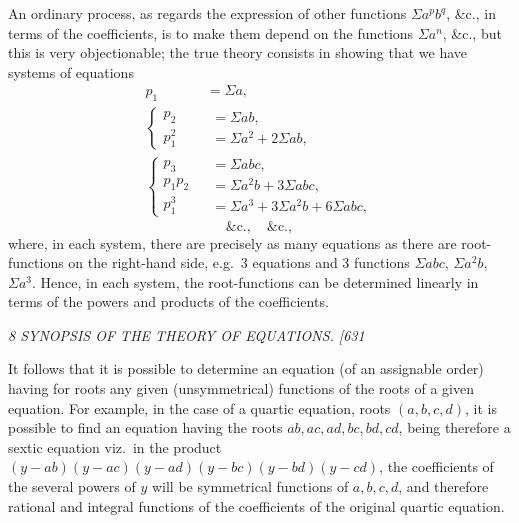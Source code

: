 \documentclass[12pt,a4paper]{article}
\begin{document}
An ordinary process, as regards the expression of other functions $\Sigma a^p b^q$, \&c., in terms of the coefficients, is to make them depend on the functions $\Sigma a^n$, \&c., but this is very objectionable; the true theory consists in showing that we have systems of equations
\[
\begin{array}{rl}
p_1 &= \Sigma a, \\[2pt]
\left\{\begin{array}{r} p_2 \\ p_1^2 \end{array}\right. &
\!\!\!\begin{array}{l} = \Sigma a b, \\ = \Sigma a^2 + 2\Sigma a b, \end{array} \\[10pt]
\left\{\begin{array}{r} p_3 \\ p_1 p_2 \\ p_1^3 \end{array}\right. &
\!\!\!\begin{array}{l} = \Sigma a b c, \\ = \Sigma a^2 b + 3\Sigma a b c, \\ = \Sigma a^3 + 3\Sigma a^2 b + 6\Sigma a b c, \end{array}
\end{array}
\]
\[
\&\text{c.}, \quad \&\text{c.},
\]
where, in each system, there are precisely as many equations as there are root-functions on the right-hand side, e.g.\ 3 equations and 3 functions $\Sigma a b c$, $\Sigma a^2 b$, $\Sigma a^3$. Hence, in each system, the root-functions can be determined linearly in terms of the powers and products of the coefficients.

\clearpage
\setcounter{page}{8}

\begin{center}
\textit{8 \hfill SYNOPSIS OF THE THEORY OF EQUATIONS. \hfill [631}
\end{center}

It follows that it is possible to determine an equation (of an assignable order) having for roots any given (unsymmetrical) functions of the roots of a given equation. For example, in the case of a quartic equation, roots $(a, b, c, d)$, it is possible to find an equation having the roots $ab, ac, ad, bc, bd, cd$, being therefore a sextic equation viz.\ in the product $(y - ab)(y - ac)(y - ad)(y - bc)(y - bd)(y - cd)$, the coefficients of the several powers of $y$ will be symmetrical functions of $a, b, c, d$, and therefore rational and integral functions of the coefficients of the original quartic equation.
\end{document}
